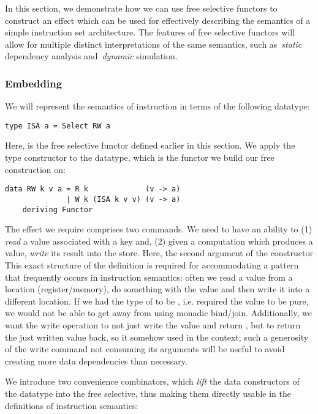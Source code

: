 In this section, we demonstrate how we can use free selective functors to construct an
effect which can be used for effectively describing the semantics of a simple instruction set
architecture. The features of free selective functors will allow for multiple distinct
interpretations of the same semantics, such as~\emph{static} dependency analysis
and~\emph{dynamic} simulation.

\subsubsection{Embedding}

We will represent the semantics of instruction in terms of the following datatype:

\begin{verbatim}
type ISA a = Select RW a
\end{verbatim}

Here,  is the free selective functor defined earlier in this section.
We apply the  type constructor to the  datatype, which is the
functor we build our free construction on:

\begin{verbatim}
data RW k v a = R k             (v -> a)
              | W k (ISA k v v) (v -> a)
    deriving Functor
\end{verbatim}

The effect we require comprises two commands. We need to have an ability to (1)
\emph{read} a value associated with a key and, (2) given a computation which produces a value,
\emph{write} its result into the store. Here, the second argument of the  constructor
This exact structure of the definition is required for accommodating a pattern that
frequently occurs in instruction semantics: often we read a value from a location
(register/memory), do something with the value and then write it into a different location.
If we had the type of  to be , i.e. required the value to be pure,
we would not be able to get away from using monadic bind/join. Additionally, we want the write
operation to not just write the value and return \hs{()}, but to return the just written value
back, so it somehow used in the context; such a generosity of the write command not consuming
its arguments will be useful to avoid creating more data dependencies than necessary.

We introduce two convenience combinators, which \emph{lift} the data constructors
of the  datatype into the free selective, thus making them directly usable in
the definitions of instruction semantics:

